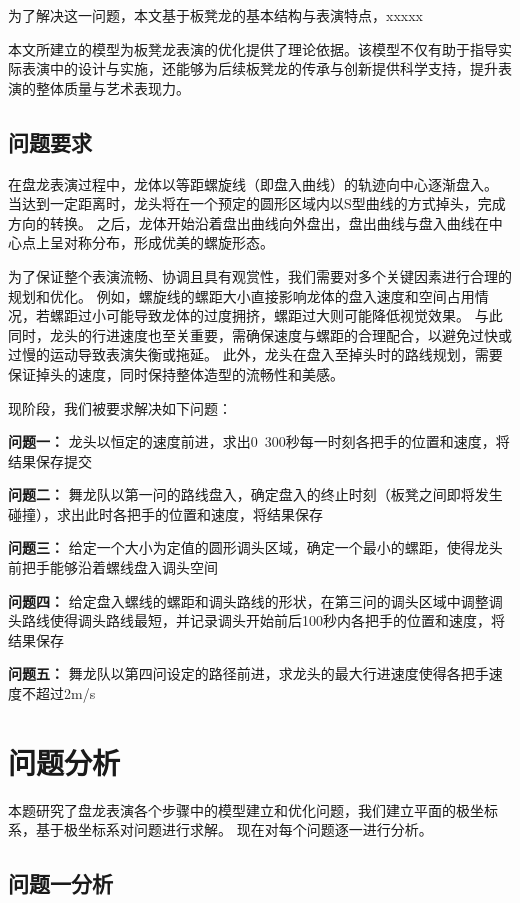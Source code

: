 \documentclass[withoutpreface,bwprint]{cumcmthesis} %
\newcommand{\tbf}[1]{\textbf{#1}}
\begin{document}
为了解决这一问题，本文基于板凳龙的基本结构与表演特点，xxxxx

本文所建立的模型为板凳龙表演的优化提供了理论依据。该模型不仅有助于指导实际表演中的设计与实施，还能够为后续板凳龙的传承与创新提供科学支持，提升表演的整体质量与艺术表现力。

\subsection{问题要求}

在盘龙表演过程中，龙体以等距螺旋线（即盘入曲线）的轨迹向中心逐渐盘入。
当达到一定距离时，龙头将在一个预定的圆形区域内以S型曲线的方式掉头，完成方向的转换。
之后，龙体开始沿着盘出曲线向外盘出，盘出曲线与盘入曲线在中心点上呈对称分布，形成优美的螺旋形态。

为了保证整个表演流畅、协调且具有观赏性，我们需要对多个关键因素进行合理的规划和优化。
例如，螺旋线的螺距大小直接影响龙体的盘入速度和空间占用情况，若螺距过小可能导致龙体的过度拥挤，螺距过大则可能降低视觉效果。
与此同时，龙头的行进速度也至关重要，需确保速度与螺距的合理配合，以避免过快或过慢的运动导致表演失衡或拖延。
此外，龙头在盘入至掉头时的路线规划，需要保证掉头的速度，同时保持整体造型的流畅性和美感。

现阶段，我们被要求解决如下问题：

\newpage

\tbf{问题一：} 龙头以恒定的速度前进，求出0~300秒每一时刻各把手的位置和速度，将结果保存提交

\tbf{问题二：} 舞龙队以第一问的路线盘入，确定盘入的终止时刻（板凳之间即将发生碰撞），求出此时各把手的位置和速度，将结果保存

\tbf{问题三：} 给定一个大小为定值的圆形调头区域，确定一个最小的螺距，使得龙头前把手能够沿着螺线盘入调头空间

\tbf{问题四：} 给定盘入螺线的螺距和调头路线的形状，在第三问的调头区域中调整调头路线使得调头路线最短，并记录调头开始前后100秒内各把手的位置和速度，将结果保存

\tbf{问题五：} 舞龙队以第四问设定的路径前进，求龙头的最大行进速度使得各把手速度不超过2m/s

\section{问题分析}
本题研究了盘龙表演各个步骤中的模型建立和优化问题，我们建立平面的极坐标系，基于极坐标系对问题进行求解。
现在对每个问题逐一进行分析。
\subsection{问题一分析}
\end{document}
